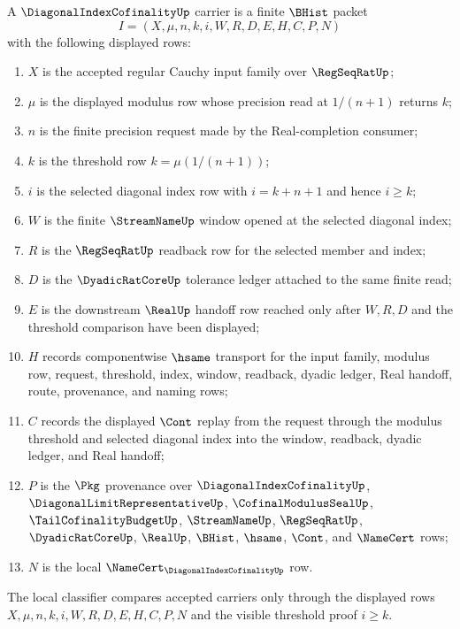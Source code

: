 \begin{definition}
\label{def:diagonal-index-cofinality-carrier}
A $\DiagonalIndexCofinalityUp$ carrier is a finite $\BHist$ packet
$$
I=(X,\mu,n,k,i,W,R,D,E,H,C,P,N)
$$
with the following displayed rows:
\begin{enumerate}
\item $X$ is the accepted regular Cauchy input family over $\RegSeqRatUp$;
\item $\mu$ is the displayed modulus row whose precision read at $1/(n+1)$ returns $k$;
\item $n$ is the finite precision request made by the Real-completion consumer;
\item $k$ is the threshold row $k=\mu(1/(n+1))$;
\item $i$ is the selected diagonal index row with $i=k+n+1$ and hence $i\geq k$;
\item $W$ is the finite $\StreamNameUp$ window opened at the selected diagonal index;
\item $R$ is the $\RegSeqRatUp$ readback row for the selected member and index;
\item $D$ is the $\DyadicRatCoreUp$ tolerance ledger attached to the same finite read;
\item $E$ is the downstream $\RealUp$ handoff row reached only after $W,R,D$ and the threshold comparison have been displayed;
\item $H$ records componentwise $\hsame$ transport for the input family, modulus row, request, threshold, index, window, readback, dyadic ledger, Real handoff, route, provenance, and naming rows;
\item $C$ records the displayed $\Cont$ replay from the request through the modulus threshold and selected diagonal index into the window, readback, dyadic ledger, and Real handoff;
\item $P$ is the $\Pkg$ provenance over $\DiagonalIndexCofinalityUp$, $\DiagonalLimitRepresentativeUp$, $\CofinalModulusSealUp$, $\TailCofinalityBudgetUp$, $\StreamNameUp$, $\RegSeqRatUp$, $\DyadicRatCoreUp$, $\RealUp$, $\BHist$, $\hsame$, $\Cont$, and $\NameCert$ rows;
\item $N$ is the local $\NameCert_{\DiagonalIndexCofinalityUp}$ row.
\end{enumerate}
The local classifier compares accepted carriers only through the displayed rows $X,\mu,n,k,i,W,R,D,E,H,C,P,N$ and the visible threshold proof $i\geq k$.
\end{definition}

